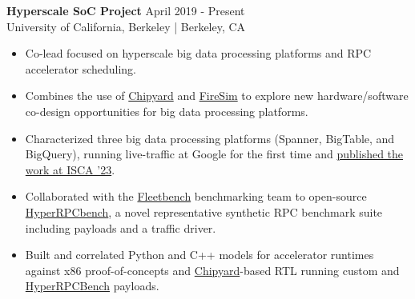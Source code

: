 \documentclass[line]{res}
\begin{document}
\begin{resume}
\label{sec:hyperscale-soc}
\textbf{Hyperscale SoC Project} \hfill April 2019 - Present
\\
University of California, Berkeley | Berkeley, CA
\\
\vspace{-3mm}
\begin{itemize}
\item Co-lead focused on hyperscale big data processing platforms and RPC accelerator scheduling.
\item Combines the use of \hyperref[sec:chipyard]{Chipyard} and \hyperref[sec:firesim]{FireSim} to explore new hardware/software co-design opportunities for big data processing platforms.
\item Characterized three big data processing platforms (Spanner, BigTable, and BigQuery), running live-traffic at Google for the first time and \hyperref[sec:iscapaper]{published the work at ISCA '23}.
\item Collaborated with the \href{https://github.com/google/fleetbench}{Fleetbench} benchmarking team to open-source \href{https://github.com/google/fleetbench/tree/cd20746b68b307b148a761c676d6400f2541082d/fleetbench/rpc}{HyperRPCbench}, a novel representative synthetic RPC benchmark suite including payloads and a traffic driver.
\item Built and correlated Python and C++ models for accelerator runtimes against x86 proof-of-concepts and \hyperref[sec:chipyard]{Chipyard}-based RTL running custom and \href{https://github.com/google/fleetbench/tree/cd20746b68b307b148a761c676d6400f2541082d/fleetbench/rpc}{HyperRPCBench} payloads.
\end{itemize}


\end{resume}
\end{document}
